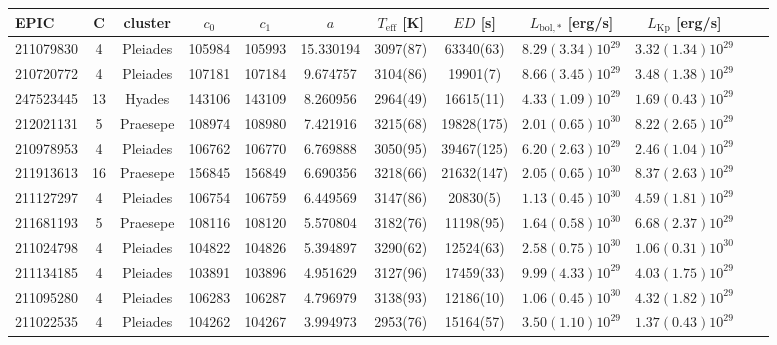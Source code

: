 \begin{tabular}{lccccccccccr}
\hline
      EPIC &   C &   cluster &   $c_0$ &   $c_1$ &        $a$ & $T_\mathrm{eff}$ [K] &    $ED$ [s] & $L_\mathrm{bol,*}$ [erg/s] & $L_\mathrm{Kp}$ [erg/s] \\
\hline
 211079830 &   4 &  Pleiades &  105984 &  105993 &  15.330194 &             3097(87) &   63340(63) &        $8.29(3.34)10^{29}$ &     $3.32(1.34)10^{29}$ \\
 210720772 &   4 &  Pleiades &  107181 &  107184 &   9.674757 &             3104(86) &    19901(7) &        $8.66(3.45)10^{29}$ &     $3.48(1.38)10^{29}$ \\
 247523445 &  13 &    Hyades &  143106 &  143109 &   8.260956 &             2964(49) &   16615(11) &        $4.33(1.09)10^{29}$ &     $1.69(0.43)10^{29}$ \\
 212021131 &   5 &  Praesepe &  108974 &  108980 &   7.421916 &             3215(68) &  19828(175) &        $2.01(0.65)10^{30}$ &     $8.22(2.65)10^{29}$ \\
 210978953 &   4 &  Pleiades &  106762 &  106770 &   6.769888 &             3050(95) &  39467(125) &        $6.20(2.63)10^{29}$ &     $2.46(1.04)10^{29}$ \\
 211913613 &  16 &  Praesepe &  156845 &  156849 &   6.690356 &             3218(66) &  21632(147) &        $2.05(0.65)10^{30}$ &     $8.37(2.63)10^{29}$ \\
 211127297 &   4 &  Pleiades &  106754 &  106759 &   6.449569 &             3147(86) &    20830(5) &        $1.13(0.45)10^{30}$ &     $4.59(1.81)10^{29}$ \\
 211681193 &   5 &  Praesepe &  108116 &  108120 &   5.570804 &             3182(76) &   11198(95) &        $1.64(0.58)10^{30}$ &     $6.68(2.37)10^{29}$ \\
 211024798 &   4 &  Pleiades &  104822 &  104826 &   5.394897 &             3290(62) &   12524(63) &        $2.58(0.75)10^{30}$ &     $1.06(0.31)10^{30}$ \\
 211134185 &   4 &  Pleiades &  103891 &  103896 &   4.951629 &             3127(96) &   17459(33) &        $9.99(4.33)10^{29}$ &     $4.03(1.75)10^{29}$ \\
 211095280 &   4 &  Pleiades &  106283 &  106287 &   4.796979 &             3138(93) &   12186(10) &        $1.06(0.45)10^{30}$ &     $4.32(1.82)10^{29}$ \\
 211022535 &   4 &  Pleiades &  104262 &  104267 &   3.994973 &             2953(76) &   15164(57) &        $3.50(1.10)10^{29}$ &     $1.37(0.43)10^{29}$ \\

\end{tabular}
